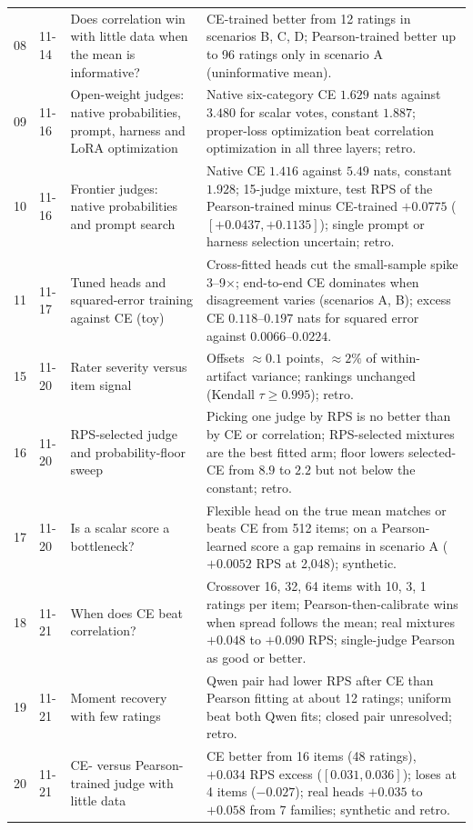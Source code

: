 {\begin{longtable}{@{}p{}p{}p{}p{}@{}}
08 & 11-14 & Does correlation win with little data when the mean is informative? & CE-trained better from 12 ratings in scenarios B, C, D; Pearson-trained better up to 96 ratings only in scenario A (uninformative mean). \\
09 & 11-16 & Open-weight judges: native probabilities, prompt, harness and LoRA optimization & Native six-category CE $1.629$ nats against $3.480$ for scalar votes, constant $1.887$; proper-loss optimization beat correlation optimization in all three layers; retro. \\
10 & 11-16 & Frontier judges: native probabilities and prompt search & Native CE $1.416$ against $5.49$ nats, constant $1.928$; 15-judge mixture, test RPS of the Pearson-trained minus CE-trained $+0.0775$ ($[+0.0437,+0.1135]$); single prompt or harness selection uncertain; retro. \\
11 & 11-17 & Tuned heads and squared-error training against CE (toy) & Cross-fitted heads cut the small-sample spike 3--9$\times$; end-to-end CE dominates when disagreement varies (scenarios A, B); excess CE $0.118$--$0.197$ nats for squared error against $0.0066$--$0.0224$. \\
15 & 11-20 & Rater severity versus item signal & Offsets $\approx0.1$ points, $\approx2\%$ of within-artifact variance; rankings unchanged (Kendall $\tau\ge0.995$); retro. \\
16 & 11-20 & RPS-selected judge and probability-floor sweep & Picking one judge by RPS is no better than by CE or correlation; RPS-selected mixtures are the best fitted arm; floor lowers selected-CE from $8.9$ to $2.2$ but not below the constant; retro. \\
17 & 11-20 & Is a scalar score a bottleneck? & Flexible head on the true mean matches or beats CE from 512 items; on a Pearson-learned score a gap remains in scenario A ($+0.0052$ RPS at 2{,}048); synthetic. \\
18 & 11-21 & When does CE beat correlation? & Crossover 16, 32, 64 items with 10, 3, 1 ratings per item; Pearson-then-calibrate wins when spread follows the mean; real mixtures $+0.048$ to $+0.090$ RPS; single-judge Pearson as good or better. \\
19 & 11-21 & Moment recovery with few ratings & Qwen pair had lower RPS after CE than Pearson fitting at about 12 ratings; uniform beat both Qwen fits; closed pair unresolved; retro. \\
20 & 11-21 & CE- versus Pearson-trained judge with little data & CE better from 16 items (48 ratings), $+0.034$ RPS excess ($[0.031,0.036]$); loses at 4 items ($-0.027$); real heads $+0.035$ to $+0.058$ from 7 families; synthetic and retro. \\

\end{longtable}}
